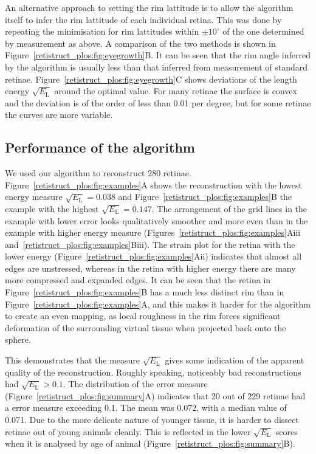 \documentclass[10pt]{article}
\begin{document}
An alternative approach to setting the rim lattitude is to allow the
algorithm itself to infer the rim lattitude of each individual
retina. This was done by repeating the minimisation for rim lattitudes
within $\pm10^\circ$ of the one determined by measurement as above. A
comparison of the two methods is shown in
Figure~\ref{retistruct_plos:fig:eyegrowth}B. It can be seen that the
rim angle inferred by the algorithm is usually less than that inferred
from measurement of standard retinae.
Figure~\ref{retistruct_plos:fig:eyegrowth}C shows deviations of the
length energy $\sqrt{E_\mathrm{L}}$ around the optimal value. For many
retinae the surface is convex and the deviation is of the order of
less than 0.01 per degree, but for some retinae the curves are more
variable.

\subsection*{Performance of the algorithm}
\label{retistruct_plos:sec:perf-algor}

We used our algorithm to reconstruct 280 retinae. 
Figure~\ref{retistruct_plos:fig:examples}A shows the reconstruction
with the lowest energy measure $\sqrt{E_\mathrm{L}}=0.038$ and
Figure~\ref{retistruct_plos:fig:examples}B the example with the
highest $\sqrt{E_\mathrm{L}}=0.147$. The arrangement of the grid lines
in the example with lower error looks qualitatively smoother and more
even than in the example with higher energy measure
(Figures~\ref{retistruct_plos:fig:examples}Aiii
and~\ref{retistruct_plos:fig:examples}Biii). The strain plot for the
retina with the lower energy
(Figure~\ref{retistruct_plos:fig:examples}Aii) indicates that almost
all edges are unstressed, whereas in the retina with higher energy
there are many more compressed and expanded edges. It can be seen that
the retina in Figure~\ref{retistruct_plos:fig:examples}B has a much
less distinct rim than in Figure~\ref{retistruct_plos:fig:examples}A,
and this makes it harder for the algorithm to create an even mapping,
as local roughness in the rim forces significant deformation of the
surrounding virtual tissue when projected back onto the sphere.

This demonstrates that the measure $\sqrt{E_\mathrm{L}}$ gives some
indication of the apparent quality of the reconstruction. Roughly
speaking, noticeably bad reconstructions had
$\sqrt{E_\mathrm{L}}>0.1$. The distribution of the error measure
(Figure~\ref{retistruct_plos:fig:summary}A) indicates that 20 out of
229 retinae had a error measure exceeding 0.1. The mean was 0.072,
with a median value of 0.071. Due to the more delicate nature of
younger tissue, it is harder to dissect retinae out of young animals
cleanly. This is reflected in the lower $\sqrt{E_\mathrm{L}}$ scores
when it is analysed by age of animal
(Figure~\ref{retistruct_plos:fig:summary}B).
\end{document}
